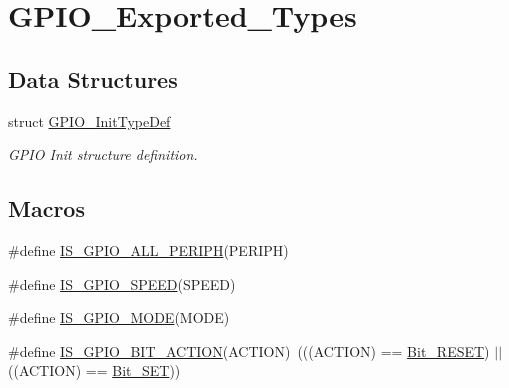 \hypertarget{group___g_p_i_o___exported___types}{}\section{G\+P\+I\+O\+\_\+\+Exported\+\_\+\+Types}
\label{group___g_p_i_o___exported___types}
\subsection*{Data Structures}
\begin{DoxyCompactItemize}
\item 
struct \mbox{\hyperlink{struct_g_p_i_o___init_type_def}{G\+P\+I\+O\+\_\+\+Init\+Type\+Def}}
\begin{DoxyCompactList}\small\item\em G\+P\+IO Init structure definition. \end{DoxyCompactList}\end{DoxyCompactItemize}
\subsection*{Macros}
\begin{DoxyCompactItemize}
\item 
\#define \mbox{\hyperlink{group___g_p_i_o___exported___types_ga68b2a1f0b05c13978217db5439c7f790}{I\+S\+\_\+\+G\+P\+I\+O\+\_\+\+A\+L\+L\+\_\+\+P\+E\+R\+I\+PH}}(P\+E\+R\+I\+PH)
\item 
\#define \mbox{\hyperlink{group___g_p_i_o___exported___types_ga888e1f951df2fe9dbf827528051a3a56}{I\+S\+\_\+\+G\+P\+I\+O\+\_\+\+S\+P\+E\+ED}}(S\+P\+E\+ED)
\item 
\#define \mbox{\hyperlink{group___g_p_i_o___exported___types_gacc5fde3eef57ec3c558c11d0011d900c}{I\+S\+\_\+\+G\+P\+I\+O\+\_\+\+M\+O\+DE}}(M\+O\+DE)
\item 
\#define \mbox{\hyperlink{group___g_p_i_o___exported___types_ga6b882caa8ed9857c5c7267959a7818c5}{I\+S\+\_\+\+G\+P\+I\+O\+\_\+\+B\+I\+T\+\_\+\+A\+C\+T\+I\+ON}}(A\+C\+T\+I\+ON)~(((A\+C\+T\+I\+ON) == \mbox{\hyperlink{group___g_p_i_o___exported___types_gga176130b21c0e719121470a6042d4cf19ae2c026f2b44a949f82a65f3385edef09}{Bit\+\_\+\+R\+E\+S\+ET}}) $\vert$$\vert$ ((A\+C\+T\+I\+ON) == \mbox{\hyperlink{group___g_p_i_o___exported___types_gga176130b21c0e719121470a6042d4cf19a3c477841a6ceec13fe47ef322432b992}{Bit\+\_\+\+S\+ET}}))
\end{DoxyCompactItemize}
